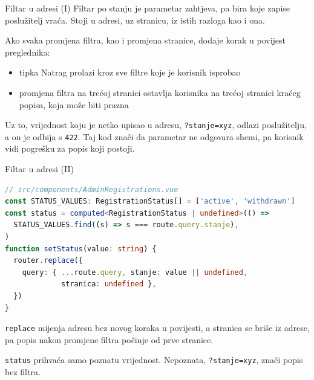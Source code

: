 
\begin{frame}{Filtar u adresi (I)}
Filtar po stanju je parametar zahtjeva, pa bira koje zapise poslužitelj vraća. Stoji u adresi, uz stranicu, iz istih razloga kao i ona.

\vspace{0.6em}
Ako svaka promjena filtra, kao i promjena stranice, dodaje korak u povijest preglednika:

\vspace{0.3em}
\begin{itemize}
  \itemsep0.45em
  \item tipka Natrag prolazi kroz sve filtre koje je korisnik isprobao
  \item promjena filtra na trećoj stranici ostavlja korisnika na trećoj stranici kraćeg popisa, koja može biti prazna
\end{itemize}

\vspace{0.6em}
Uz to, vrijednost koju je netko upisao u adresu, \texttt{?stanje=xyz}, odlazi poslužitelju, a on je odbija s \texttt{422}. Taj kod znači da parametar ne odgovara shemi, pa korisnik vidi pogrešku za popis koji postoji.
\end{frame}

\begin{frame}[fragile]{Filtar u adresi (II)}
\begin{lstlisting}[language=typescript]
// src/components/AdminRegistrations.vue
const STATUS_VALUES: RegistrationStatus[] = ['active', 'withdrawn']
const status = computed<RegistrationStatus | undefined>(() =>
  STATUS_VALUES.find((s) => s === route.query.stanje),
)
function setStatus(value: string) {
  router.replace({
    query: { ...route.query, stanje: value || undefined,
             stranica: undefined },
  })
}
\end{lstlisting}

\vspace{0.1em}
\texttt{replace} mijenja adresu bez novog koraka u povijesti, a stranica se briše iz adrese, pa popis nakon promjene filtra počinje od prve stranice.

\vspace{0.3em}
\texttt{status} prihvaća samo poznatu vrijednost. Nepoznata, \texttt{?stanje=xyz}, znači popis bez filtra.
\end{frame}

